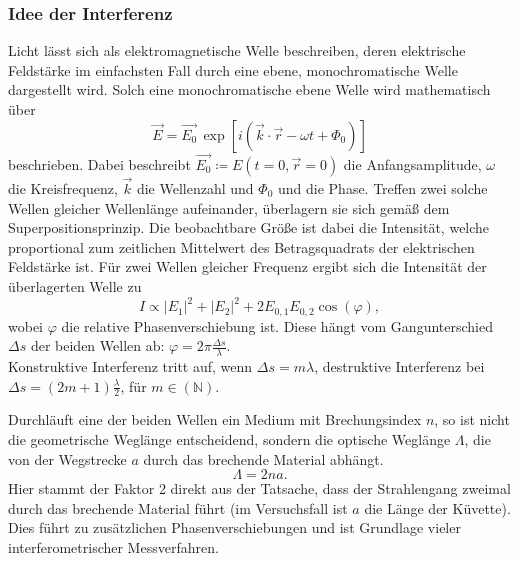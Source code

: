 \subsubsection[Interferenz]{Idee der Interferenz}
Licht lässt sich als elektromagnetische Welle beschreiben, deren elektrische Feldstärke im einfachsten Fall durch eine ebene, monochromatische Welle dargestellt wird. Solch eine monochromatische ebene Welle wird mathematisch über
\begin{equation}
    \label{wellengleichung}
    \vec{E} = \vec{E_0} \, \exp{[i(\vec{k} \cdot \vec{r} - \omega t + \Phi_0)]}
\end{equation}
beschrieben. Dabei beschreibt \(\vec{E_0}\coloneq E(t=0,\vec{r}=0)\) die Anfangsamplitude, \(\omega\) die Kreisfrequenz, \(\vec{k}\) die Wellenzahl und \(\Phi_0\) und die Phase.
Treffen zwei solche Wellen gleicher Wellenlänge aufeinander, überlagern sie sich gemäß dem Superpositionsprinzip. Die beobachtbare Größe ist dabei die Intensität, welche proportional zum zeitlichen Mittelwert des Betragsquadrats der elektrischen Feldstärke ist.
Für zwei Wellen gleicher Frequenz ergibt sich die Intensität der überlagerten Welle zu
\begin{equation}
    \label{Interferenz}
    I \propto |E_1|^2 + |E_2|^2 + 2 E_{0,1} E_{0,2} \cos(\varphi),
\end{equation}
wobei \(\varphi\) die relative Phasenverschiebung ist. Diese hängt vom Gangunterschied \(\Delta s\) der beiden Wellen ab: \(\varphi = 2\pi\frac{\Delta s}{\lambda}\).\\
Konstruktive Interferenz tritt auf, wenn \(\Delta s = m\lambda\), destruktive Interferenz bei \(\Delta s = (2m+1)\frac{\lambda}{2}\), für \(m\in(\mathbb{N})\). 

Durchläuft eine der beiden Wellen ein Medium mit Brechungsindex \(n\), so ist nicht die geometrische Weglänge entscheidend, sondern die optische Weglänge \(\Lambda\), die von der Wegstrecke \(a\) durch das brechende Material abhängt.
\begin{equation}
    \label{OptWeg}
    \Lambda = 2 n a.
\end{equation}
Hier stammt der Faktor 2 direkt aus der Tatsache, dass der Strahlengang zweimal durch das brechende Material führt (im Versuchsfall ist \(a\) die Länge der Küvette). Dies führt zu zusätzlichen Phasenverschiebungen und ist Grundlage vieler interferometrischer Messverfahren.

